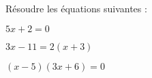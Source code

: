 \documentclass{automatisme}
\begin{document}
\begin{frame}
	Résoudre les équations suivantes :

	\begin{multicols}{3}
		$5x + 2 = 0$ 
		
		\vspace*{7em}

		\columnbreak

		$3x - 11 = 2(x + 3)$

		\columnbreak

		$(x - 5)(3x + 6) = 0$
	\end{multicols}
\end{frame}
\end{document}
